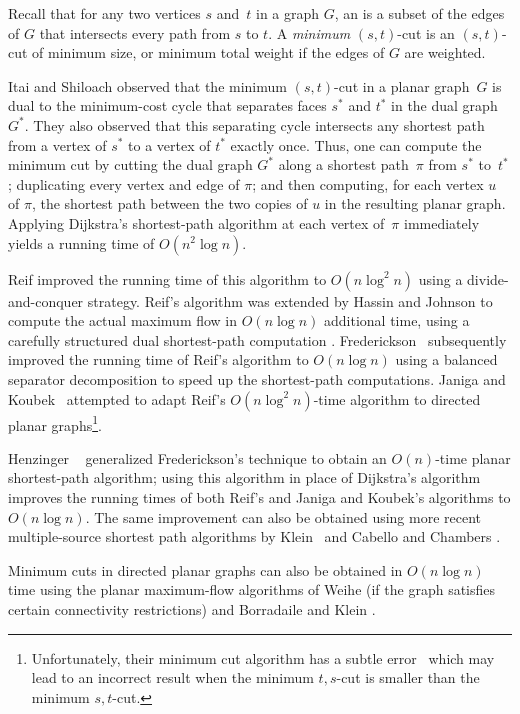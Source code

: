 Recall that for any two vertices $s$ and~$t$ in a graph $G$, an  is a subset of the edges of $G$ that intersects every path from $s$ to $t$.  A \emph{minimum} $(s,t)$-cut is an $(s,t)$-cut of minimum size, or minimum total weight if the edges of $G$ are weighted.

Itai and Shiloach \cite{is-mfpn-79} observed that the minimum $(s,t)$-cut in a planar graph~$G$ is dual to the minimum-cost cycle that separates faces $s^*$ and $t^*$ in the dual graph $G^*$.  They also observed that this separating cycle intersects any shortest path from a vertex of $s^*$ to a vertex of $t^*$ exactly once.  Thus, one can compute the minimum cut by cutting the dual graph $G^*$ along a shortest path~$\pi$ from $s^*$ to~$t^*$; duplicating every vertex and edge of $\pi$; and then computing, for each vertex $u$ of $\pi$, the shortest path between the two copies of $u$ in the resulting planar graph.  Applying Dijkstra's shortest-path algorithm at each vertex of~$\pi$ immediately yields a running time of $O(n^2\log n)$.

Reif \cite{r-mstcp-83} improved the running time of this algorithm to $O(n\log^2 n)$ using a divide-and-conquer strategy.  Reif's algorithm was extended by Hassin and Johnson to compute the actual maximum flow in $O(n\log n)$ additional time, using a carefully structured dual shortest-path computation \cite{hj-oamfu-85}.  Frederickson~\cite{f-faspp-87} subsequently improved the running time of Reif's algorithm to $O(n\log n)$ using a balanced separator decomposition to speed up the shortest-path computations.  Janiga and Koubek~\cite{jk-mcdpn-92} attempted to adapt Reif's $O(n\log^2 n)$-time algorithm to directed planar graphs\footnote{Unfortunately, their minimum cut algorithm has a subtle
error~\cite{kn-mcupg-11} which may lead to an incorrect result when the
minimum $t,s$-cut is smaller than the minimum $s,t$-cut.}.

Henzinger \etal~\cite{hkrs-fspap-97} generalized Frederickson's technique to obtain an $O(n)$-time planar shortest-path algorithm; using this algorithm in place of Dijkstra's algorithm improves the running times of both Reif's and Janiga and Koubek's algorithms to $O(n\log n)$.  The same improvement can also be obtained using more recent multiple-source shortest path algorithms by Klein~\cite{k-msspp-05} and Cabello and Chambers \cite{cc-msspg-07}.

Minimum cuts in directed planar graphs can also be obtained in $O(n\log n)$ time using the planar maximum-flow algorithms of Weihe \cite{w-mstfp-97} (if the graph satisfies certain connectivity restrictions) and Borradaile and Klein \cite{b-epnfc-08, bk-tamfd-06, bk-amfdp-09}.

